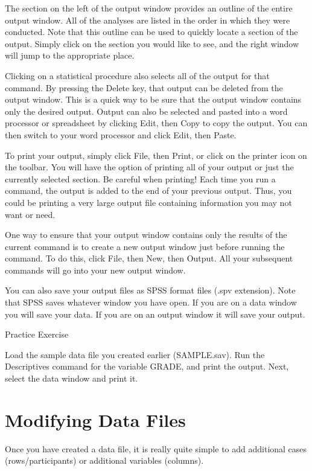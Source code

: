 \documentclass[
]{book}
\begin{document}
The section on the left of the output window provides an outline of the entire output window. All of the analyses are listed in the order in which they were conducted. Note that this outline can be used to quickly locate a section of the output. Simply click on the section you would like to see, and the right window will jump to the appropriate place.

Clicking on a statistical procedure also selects all of the output for that command. By pressing the Delete key, that output can be deleted from the output window. This is a quick way to be sure that the output window contains only the desired output. Output can also be selected and pasted into a word processor or spreadsheet by clicking Edit, then Copy to copy the output. You can then switch to your word processor and click Edit, then Paste.

To print your output, simply click File, then Print, or click on the printer icon on the toolbar. You will have the option of printing all of your output or just the currently selected section. Be careful when printing! Each time you run a command, the output is added to the end of your previous output. Thus, you could be printing a very large output file containing information you may not want or need.

One way to ensure that your output window contains only the results of the current command is to create a new output window just before running the command. To do this, click File, then New, then Output. All your subsequent commands will go into your new output window.

You can also save your output files as SPSS format files (.spv extension). Note that SPSS saves whatever window you have open. If you are on a data window you will save your data. If you are on an output window it will save your output.

Practice Exercise

Load the sample data file you created earlier (SAMPLE.sav). Run the Descriptives command for the variable GRADE, and print the output. Next, select the data window and print it.

\hypertarget{modifying-data-files}{%
\section{Modifying Data Files}\label{modifying-data-files}}

Once you have created a data file, it is really quite simple to add additional cases (rows/participants) or additional variables (columns).
\end{document}
